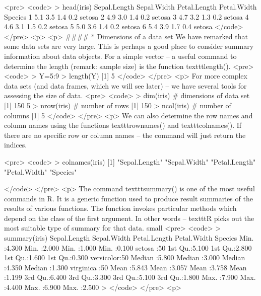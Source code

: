 <pre>
<code>
> head(iris)
  Sepal.Length Sepal.Width Petal.Length Petal.Width Species
1          5.1         3.5          1.4         0.2  setosa
2          4.9         3.0          1.4         0.2  setosa
3          4.7         3.2          1.3         0.2  setosa
4          4.6         3.1          1.5         0.2  setosa
5          5.0         3.6          1.4         0.2  setosa
6          5.4         3.9          1.7         0.4  setosa
</code>
</pre>
<p>
<p>
####        * {Dimensions of a data set}
We have remarked that some data sets are very large. This is perhaps a good place to consider summary information about data objects.
For a simple vector – a useful command to determine the length (remark: sample size) is the function texttt{length()}.
<pre>
<code>
> Y=5:9
> length(Y)
[1] 5
</code>
</pre>
<p>
For more complex data sets (and data frames, which we will see later) – we have several tools for assessing the size of data.
<pre>
<code>
> dim(iris)  # dimensions of data set
[1] 150   5
> nrow(iris) # number of rows
[1] 150
> ncol(iris) # number of columns
[1] 5
</code>
</pre>
<p>
We can also determine the row names and column names using the functions texttt{rownames()} and texttt{colnames()}.
If there are no specific row or column names – the command will just return the indices.

<pre>
<code>
> colnames(iris)
[1] "Sepal.Length" "Sepal.Width"  "Petal.Length" "Petal.Width"  "Species"

</code>
</pre>
<p>
The command texttt{summary()} is one of the most useful commands in R. It is a generic function used to produce result summaries of the results of various functions. The function invokes particular methods which depend on the class of the first argument. 
In other words – texttt{R} picks out the most suitable type of summary for that data.
{
	small
<pre>
<code>
> summary(iris)
  Sepal.Length    Sepal.Width     Petal.Length    Petal.Width          Species  
 Min.   :4.300   Min.   :2.000   Min.   :1.000   Min.   :0.100   setosa    :50  
 1st Qu.:5.100   1st Qu.:2.800   1st Qu.:1.600   1st Qu.:0.300   versicolor:50  
 Median :5.800   Median :3.000   Median :4.350   Median :1.300   virginica :50  
 Mean   :5.843   Mean   :3.057   Mean   :3.758   Mean   :1.199                  
 3rd Qu.:6.400   3rd Qu.:3.300   3rd Qu.:5.100   3rd Qu.:1.800                  
 Max.   :7.900   Max.   :4.400   Max.   :6.900   Max.   :2.500                  
>
</code>
</pre>
<p>
}

